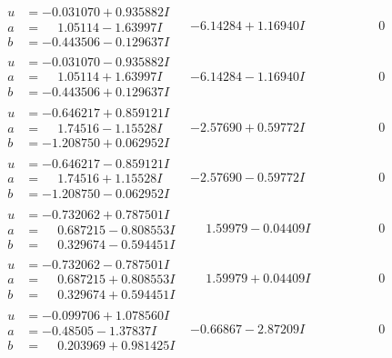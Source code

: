 \documentclass[1p]{elsarticle_modified}
\theoremstyle{definition}
\begin{document}
$$\begin{array}{c|c|c}
\begin{aligned}
u &= -0.031070 + 0.935882 I \\
a &= \phantom{-}1.05114 - 1.63997 I \\
b &= -0.443506 - 0.129637 I\end{aligned}
 & -6.14284 + 1.16940 I & \phantom{-0.000000 } 0 \\ \hline\begin{aligned}
u &= -0.031070 - 0.935882 I \\
a &= \phantom{-}1.05114 + 1.63997 I \\
b &= -0.443506 + 0.129637 I\end{aligned}
 & -6.14284 - 1.16940 I & \phantom{-0.000000 } 0 \\ \hline\begin{aligned}
u &= -0.646217 + 0.859121 I \\
a &= \phantom{-}1.74516 - 1.15528 I \\
b &= -1.208750 + 0.062952 I\end{aligned}
 & -2.57690 + 0.59772 I & \phantom{-0.000000 } 0 \\ \hline\begin{aligned}
u &= -0.646217 - 0.859121 I \\
a &= \phantom{-}1.74516 + 1.15528 I \\
b &= -1.208750 - 0.062952 I\end{aligned}
 & -2.57690 - 0.59772 I & \phantom{-0.000000 } 0 \\ \hline\begin{aligned}
u &= -0.732062 + 0.787501 I \\
a &= \phantom{-}0.687215 - 0.808553 I \\
b &= \phantom{-}0.329674 - 0.594451 I\end{aligned}
 & \phantom{-}1.59979 - 0.04409 I & \phantom{-0.000000 } 0 \\ \hline\begin{aligned}
u &= -0.732062 - 0.787501 I \\
a &= \phantom{-}0.687215 + 0.808553 I \\
b &= \phantom{-}0.329674 + 0.594451 I\end{aligned}
 & \phantom{-}1.59979 + 0.04409 I & \phantom{-0.000000 } 0 \\ \hline\begin{aligned}
u &= -0.099706 + 1.078560 I \\
a &= -0.48505 - 1.37837 I \\
b &= \phantom{-}0.203969 + 0.981425 I\end{aligned}
 & -0.66867 - 2.87209 I & \phantom{-0.000000 } 0 \\ \hline\begin{aligned}

\end{aligned}
\end{array}$$
\end{document}
